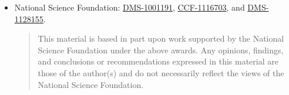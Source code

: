 {\begin{itemize}
\item National Science Foundation: 
  \href{http://www.nsf.gov/awardsearch/showAward.do?AwardNumber=1001191}{DMS-1001191}, %
  \href{http://www.nsf.gov/awardsearch/showAward.do?AwardNumber=1116703}{CCF-1116703}, %
  and 
  \href{http://www.nsf.gov/awardsearch/showAward.do?AwardNumber=1128155}{DMS-1128155}. %
  {
    \setlength{\itemsep}{0pt}
    \begin{quote}
      \noindent\scriptsize
      This material is based in part upon work supported by the
      National Science Foundation under the above awards.  Any opinions,
      findings, and conclusions or recommendations expressed in this
      material are those of the author(s) and do not necessarily reflect the
      views of the National Science Foundation.
    \end{quote}
  }
  \end{itemize}

}
\cleartooddpage

